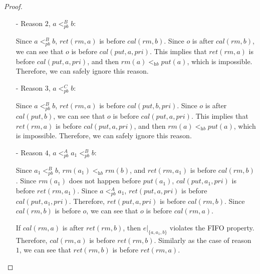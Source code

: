 \begin {proof}
\begin{itemize}
\item[-] Reason $2$, $a <_{\textit{pb}}^B b$:

    Since $a <_{\textit{pb}}^B b$, $\textit{ret}(\textit{rm},a)$ is before $\textit{cal}(\textit{rm},b)$. Since $o$ is after $\textit{cal}(\textit{rm},b)$, we can see that $o$ is before $\textit{cal}(\textit{put},a,\textit{pri})$. This implies that $\textit{ret}(\textit{rm},a)$ is before $\textit{cal}(\textit{put},a,\textit{pri})$, and then $\textit{rm}(a) <_{\textit{hb}} \textit{put}(a)$, which is impossible. Therefore, we can safely ignore this reason.

\item[-] Reason $3$, $a <_{\textit{pb}}^C b$:

    Since $a <_{\textit{pb}}^B b$, $\textit{ret}(\textit{rm},a)$ is before $\textit{cal}(\textit{put},b,\textit{pri})$. Since $o$ is after $\textit{cal}(\textit{put},b)$, we can see that $o$ is before $\textit{cal}(\textit{put},a,\textit{pri})$. This implies that $\textit{ret}(\textit{rm},a)$ is before $\textit{cal}(\textit{put},a,\textit{pri})$, and then $\textit{rm}(a) <_{\textit{hb}} \textit{put}(a)$, which is impossible. Therefore, we can safely ignore this reason.

\item[-] Reason $4$, $a <_{\textit{pb}}^A a_1 <_{\textit{pb}}^B b$:

    Since $a_1 <_{\textit{pb}}^B b$, $\textit{rm}(a_1) <_{\textit{hb}} \textit{rm}(b)$, and $\textit{ret}(\textit{rm},a_1)$ is before $\textit{cal}(\textit{rm},b)$. Since $\textit{rm}(a_1)$ does not happen before $\textit{put}(a_1)$, $\textit{cal}(\textit{put},a_1,\textit{pri})$ is before $\textit{ret}(\textit{rm},a_1)$. Since $a <_{\textit{pb}}^A a_1$, $\textit{ret}(\textit{put},a,\textit{pri})$ is before $\textit{cal}(\textit{put},a_1,\textit{pri})$. Therefore, $\textit{ret}(\textit{put},a,\textit{pri})$ is before $\textit{cal}(\textit{rm},b)$. Since $\textit{cal}(\textit{rm},b)$ is before $o$, we can see that $o$ is before $\textit{cal}(\textit{rm},a)$.

    If $\textit{cal}(\textit{rm},a)$ is after $\textit{ret}(\textit{rm},b)$, then $e \vert_{ \{ a,a_1,b \} }$ violates the FIFO property. Therefore, $\textit{cal}(\textit{rm},a)$ is before $\textit{ret}(\textit{rm},b)$. Similarly as the case of reason $1$, we can see that $\textit{ret}(\textit{rm},b)$ is before $\textit{ret}(\textit{rm},a)$.


\end{itemize}
\end{proof}
